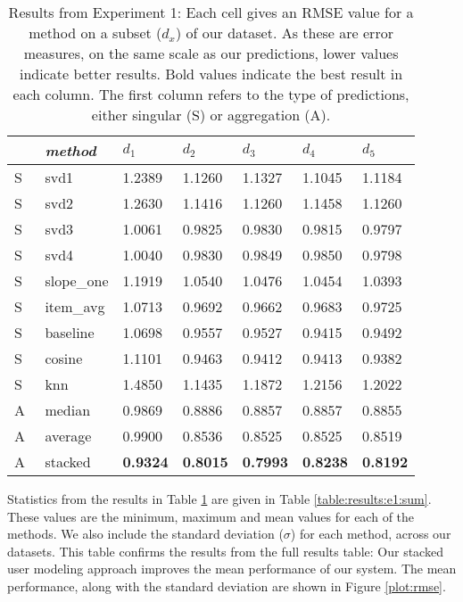 \begin{table}
  \begin{tabular*}{\textwidth}{ l p{3cm} p{1.5cm} p{1.5cm} p{1.5cm} p{1.5cm} p{1.5cm} }
    \toprule
      ~ & \emph{method} & 
      $d_1$ & $d_2$ & $d_3$ & $d_4$ & $d_5$ \\ 
    \midrule
    S & svd1          & 1.2389	  & 1.1260	  & 1.1327	  & 1.1045	  & 1.1184	 \\
    S & svd2          & 1.2630	  & 1.1416    & 1.1260	  & 1.1458	  & 1.1260	 \\
    S & svd3          & 1.0061	  & 0.9825	  & 0.9830	  & 0.9815	  & 0.9797	 \\
    S & svd4          & 1.0040	  & 0.9830	  & 0.9849	  & 0.9850	  & 0.9798	 \\
    S & slope\_one    & 1.1919	  & 1.0540	  & 1.0476	  & 1.0454	  & 1.0393   \\
    S & item\_avg     & 1.0713	  & 0.9692	  & 0.9662	  & 0.9683	  & 0.9725	 \\
    S & baseline       & 1.0698	  & 0.9557	  & 0.9527	  & 0.9415	  & 0.9492	 \\
    S & cosine   	    & 1.1101	  & 0.9463	  & 0.9412	  & 0.9413	  & 0.9382	 \\
    S & knn       	  & 1.4850	  & 1.1435	  & 1.1872    & 1.2156	  & 1.2022	 \\
    \midrule                                                                    
    A & median    	  & 0.9869	  & 0.8886	  & 0.8857    & 0.8857	  & 0.8855	 \\
    A & average    	  & 0.9900	  & 0.8536	  & 0.8525	  & 0.8525	  & 0.8519	 \\
    A & stacked       & \textbf{0.9324}	  & \textbf{0.8015}	  & \textbf{0.7993}  & \textbf{0.8238} & \textbf{0.8192} \\
    \bottomrule
  \end{tabular*}
  \caption[Results from Experiment 1]{
    Results from Experiment 1:
    Each cell gives an RMSE value for a method on a subset ($d_x$) of our dataset.
    As these are error measures, on the same scale as our predictions,
    lower values indicate better results. Bold values indicate the best result in each column.
    The first column refers to the type of predictions, either singular (S) or aggregation (A).}
  \label{table:results:e1}
\end{table}

Statistics from the results in Table \ref{table:results:e1} 
are given in Table \ref{table:results:e1:sum}.
These values are the minimum, maximum and mean values
for each of the methods. We also include
the standard deviation ($\sigma$) for each method,
across our datasets.
This table confirms the results from the full results table:
Our stacked user modeling approach improves the mean performance
of our system.
The mean performance, along with the standard deviation
are shown in Figure \ref{plot:rmse}.

